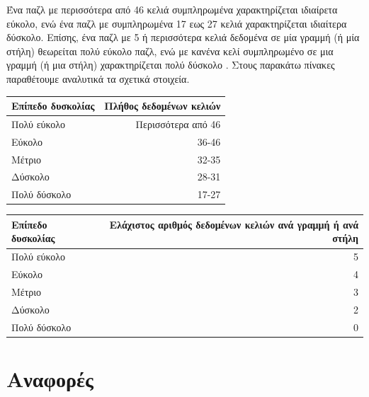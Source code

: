 \documentclass[oneside,12pt]{book}
\theoremstyle{definition}
\begin{document}
Ένα παζλ με περισσότερα από 46 κελιά συμπληρωμένα χαρακτηρίζεται ιδιαίρετα εύκολο, ενώ ένα παζλ με συμπληρωμένα 17 εως 27 κελιά χαρακτηρίζεται ιδιαίτερα δύσκολο. Επίσης, ένα παζλ με 5 ή περισσότερα κελιά δεδομένα σε μία γραμμή (ή μία στήλη) θεωρείται πολύ εύκολο παζλ, ενώ με κανένα κελί συμπληρωμένο σε μια γραμμή (ή μια στήλη) χαρακτηρίζεται πολύ δύσκολο \cite{10}. Στους παρακάτω πίνακες παραθέτουμε αναλυτικά τα σχετικά στοιχεία. \par

\begin{center}
	\begin{tabular}{ | l | r | }
		\hline
		Επίπεδο δυσκολίας & Πλήθος δεδομένων κελιών \\

		\hline
		Πολύ εύκολο & Περισσότερα από 46  \\
		\hline
		Εύκολο & 36-46  \\
		\hline
		Μέτριο & 32-35  \\
		\hline
		Δύσκολο & 28-31  \\
		\hline
		Πολύ δύσκολο & 17-27  \\
		\hline
	\end{tabular}
\end{center}

\begin{center}
	\begin{tabular}{ | l | r | }
		\hline
		Επίπεδο δυσκολίας & Ελάχιστος αριθμός δεδομένων κελιών ανά γραμμή ή ανά στήλη \\

		\hline
		Πολύ εύκολο & 5  \\
		\hline
		Εύκολο & 4  \\
		\hline
		Μέτριο & 3  \\
		\hline
		Δύσκολο & 2  \\
		\hline
		Πολύ δύσκολο & 0  \\
		\hline
	\end{tabular}
\end{center}

\chapter{Αναφορές}
\end{document}
